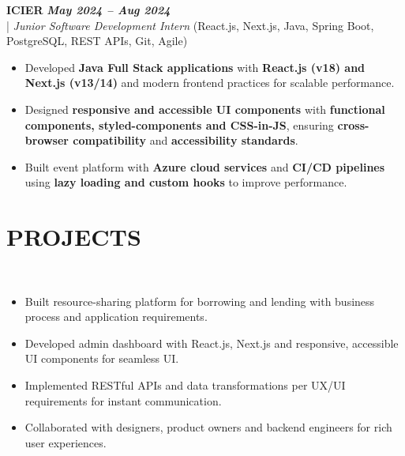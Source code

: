 \documentclass[10pt,a4paper]{article}
\begin{document}
\vspace{5pt}
\noindent
   \textbf{ICIER} \hfill \textit{\textbf{May 2024 -- Aug 2024}} \\
  \;|\;
  \textit{Junior Software Development Intern} (React.js, Next.js, Java, Spring Boot, PostgreSQL, REST APIs, Git, Agile)
  \hfill

\begin{itemize}



\item Developed \textbf{Java Full Stack applications} with \textbf{React.js (v18) and Next.js (v13/14)} and modern frontend practices for scalable performance.



\item Designed \textbf{responsive and accessible UI components} with \textbf{functional components, styled-components and CSS-in-JS}, ensuring \textbf{cross-browser compatibility} and \textbf{accessibility standards}.



\item Built event platform with \textbf{Azure cloud services} and \textbf{CI/CD pipelines} using \textbf{lazy loading and custom hooks} to improve performance.



\end{itemize}
\section*{PROJECTS}
\small

\noindent
{}\\[-12pt]
\begin{itemize}

\item Built resource-sharing platform for borrowing and lending with business process and application requirements.

\item Developed admin dashboard with React.js, Next.js and responsive, accessible UI components for seamless UI.

\item Implemented RESTful APIs and data transformations per UX/UI requirements for instant communication.

\item Collaborated with designers, product owners and backend engineers for rich user experiences.

\end{itemize}
\end{document}
